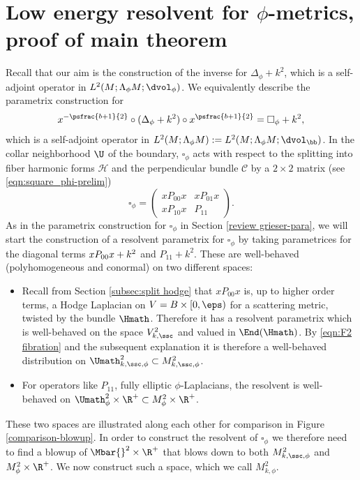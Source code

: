 \section{Low energy resolvent for \texorpdfstring{$\phi$}{phi}-metrics, proof of main theorem} \label{sec:proof main thm}
Recall that our aim is the construction of the inverse for $\Delta_{\phi} +k^2$, which is a self-adjoint operator in $L^2(M;\Lambda_\phi M;\dvol_\phi)$. We equivalently describe the parametrix construction for
\[
x^{-\psfrac{b+1}{2}} \circ (\Delta_{\phi} +k^2) \circ x^{\psfrac{b+1}{2}} = \square_\phi + k^2,
\]
which is a self-adjoint operator in $L^2(M;\Lambda_\phi M):=L^2(M;\Lambda_\phi M;\dvol_\bb)$. In the collar neighborhood
$\U$ of the boundary, $\square_\phi$ acts with respect to the splitting into
fiber harmonic forms $\mathscr{H}$ and the perpendicular bundle $\mathscr{C}$ by
a $2\times 2$ matrix (see \eqref{eqn:square_phi-prelim})
\begin{equation*}
\square_\phi =
\begin{pmatrix}
xP_{00}x & xP_{01}x \\
xP_{10}x & P_{11}
\end{pmatrix}.
\end{equation*}
As in the parametrix construction for $\square_\phi$ in Section \ref{review grieser-para}, we will start the construction of a resolvent parametrix for $\square_\phi$ by taking parametrices for the diagonal terms $xP_{00}x+\nobreak k^2$ and $P_{11}+k^2$. These are
well-behaved (\ie polyhomogeneous and conormal) on two different spaces:
\begin{itemize}
\item
Recall from Section \ref{subsec:split hodge} that $xP_{00}x$ is, up to higher order terms, a Hodge Laplacian on $V=B\times[0,\eps)$ for a scattering metric, twisted by the bundle $\Hmath$. Therefore it has a resolvent parametrix which is
well-behaved on the space $V^2_{k,\ssc}$ and valued in $\End(\Hmath)$. By \eqref{eqn:F2 fibration} and the subsequent explanation it is therefore a well-behaved distribution on $\Umath^2_{k,\ssc,\phi}\subset M^2_{k,\ssc,\phi}$.
\item
For operators like $P_{11}$, \ie fully elliptic $\phi$-Laplacians, the resolvent is well-behaved on
$\Umath^{2}_{\phi} \times \R^+\subset M^{2}_{\phi} \times \R^+$.
\end{itemize}
These two spaces are illustrated along each
other for comparison in Figure \ref{comparison-blowup}.
In order to construct the resolvent of $\square_\phi$ we therefore need to find a blowup of
$\Mbar{}^2 \times \R^+$ that blows down to both $M^{2}_{k, \ssc,\phi}$ and $M^{2}_{\phi} \times \R^+$.
We now construct such a space, which we call $M^{2}_{k,\phi}$.

